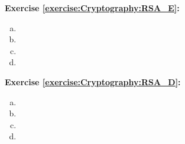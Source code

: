 \noindent\textbf{Exercise \ref{exercise:Cryptography:RSA_E}:}
% 
\begin{enumerate}[(a)]
  \item
 \item
 \item
\item
\end{enumerate}

 
\noindent\textbf{Exercise \ref{exercise:Cryptography:RSA_D}:}
% 
 \begin{enumerate}[(a)]
\item
 \item
 \item
 \item
 \end{enumerate}

 

